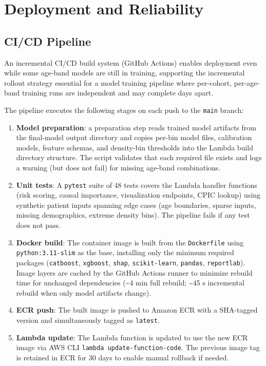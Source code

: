 \documentclass[
  12pt,
]{book}
\providecommand{\tightlist}{%
  \setlength{\itemsep}{0pt}\setlength{\parskip}{0pt}}
\begin{document}
\chapter{Deployment and Reliability}\label{sec-deployment}

\section{CI/CD Pipeline}\label{cicd-pipeline}

An incremental CI/CD build system (GitHub Actions) enables deployment
even while some age-band models are still in training, supporting the
incremental rollout strategy essential for a model training pipeline
where per-cohort, per-age-band training runs are independent and may
complete days apart.

The pipeline executes the following stages on each push to the
\texttt{main} branch:

\begin{enumerate}
\def\labelenumi{\arabic{enumi}.}
\tightlist
\item
  \textbf{Model preparation}: a preparation step reads trained model
  artifacts from the final-model output directory and copies per-bin
  model files, calibration models, feature schemas, and density-bin
  thresholds into the Lambda build directory structure. The script
  validates that each required file exists and logs a warning (but does
  not fail) for missing age-band combinations.
\item
  \textbf{Unit tests}: A \texttt{pytest} suite of 48 tests covers the
  Lambda handler functions (risk scoring, causal importance,
  visualization endpoints, CPIC lookup) using synthetic patient inputs
  spanning edge cases (age boundaries, sparse inputs, missing
  demographics, extreme density bins). The pipeline fails if any test
  does not pass.
\item
  \textbf{Docker build}: The container image is built from the
  \texttt{Dockerfile} using \texttt{python:3.11-slim} as the base,
  installing only the minimum required packages (\texttt{catboost},
  \texttt{xgboost}, \texttt{shap}, \texttt{scikit-learn},
  \texttt{pandas}, \texttt{reportlab}). Image layers are cached by the
  GitHub Actions runner to minimize rebuild time for unchanged
  dependencies (\textasciitilde4 min full rebuild; \textasciitilde45 s
  incremental rebuild when only model artifacts change).
\item
  \textbf{ECR push}: The built image is pushed to Amazon ECR with a
  SHA-tagged version and simultaneously tagged as \texttt{latest}.
\item
  \textbf{Lambda update}: The Lambda function is updated to use the new
  ECR image via AWS CLI \texttt{lambda\ update-function-code}. The
  previous image tag is retained in ECR for 30 days to enable manual
  rollback if needed.
\end{enumerate}
\end{document}
